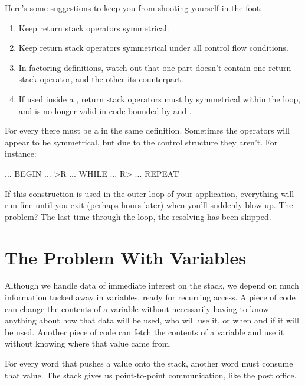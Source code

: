 Here's some suggestions to keep you from shooting yourself in the
foot:

\begin{tip}
\begin{enumerate}
\item Keep return stack operators symmetrical.
\item Keep return stack operators symmetrical under all control flow
conditions.
\item In factoring definitions, watch out that one part doesn't contain
one return stack operator, and the other its counterpart.
\item If used inside a , return stack operators
must by symmetrical within the loop, and  is no longer valid in
code bounded by  and .
\end{enumerate}
\end{tip}
For every  there must be a  in the same definition.
Sometimes the operators will appear to be symmetrical, but due to the
control structure they aren't. For instance:

\begin{Code}
... BEGIN ... >R ... WHILE ... R> ... REPEAT
\end{Code}
If this construction is used in the outer loop of your application,
everything will run fine until you exit (perhaps hours later) when you'll
suddenly blow up. The problem? The last time through the loop, the
resolving  has been skipped.%

\section{The Problem With Variables}%

Although we handle data of immediate interest on the stack, we depend
on much information tucked away in variables, ready for recurring access.
A piece of code can change the contents of a variable without
necessarily having to know anything about how that data will be used,
who will use it, or when and if it will be used. Another piece of code can
fetch the contents of a variable and use it without knowing where that
value came from.

For every word that pushes a value onto the stack, another word
must consume that value. The stack gives us point-to-point communication,
like the post office.

